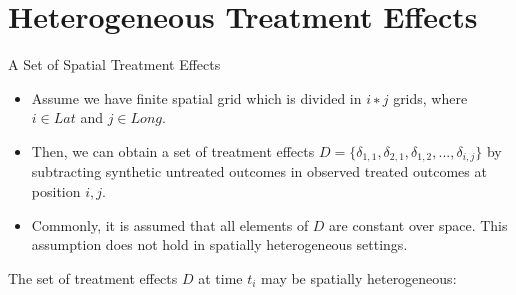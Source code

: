 \section{Heterogeneous Treatment Effects}

\begin{frame}{A Set of Spatial Treatment Effects}
\begin{itemize}
    \item Assume we have finite spatial grid which is divided in $i∗j$ grids, where $i \in Lat$ and $j \in Long$. 
    \vspace{-7pt}
    \item Then, we can obtain a set of treatment effects $D = \{\delta_{1,1}, \delta_{2,1}, \delta_{1,2}, ..., \delta_{i,j}\}$ by subtracting synthetic untreated outcomes in observed treated outcomes at position $i,j$. 
    \vspace{-7pt}
    \item Commonly, it is assumed that all elements of $D$ are constant over space. This assumption does not hold in spatially heterogeneous settings.
\end{itemize}
\end{frame}


The set of treatment effects $D$ at time $t_i$ may be spatially heterogeneous:  
\vspace{5pt}

